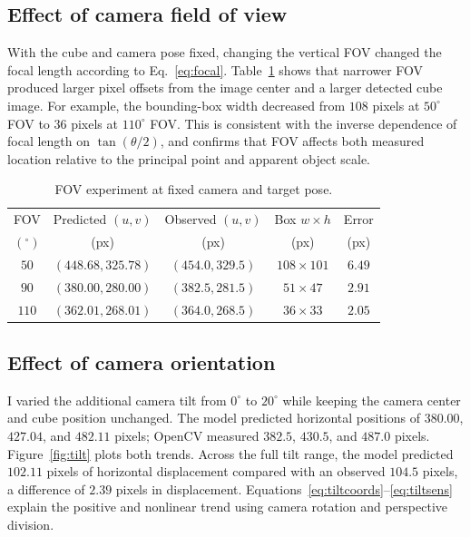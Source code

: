 \documentclass[11pt,letterpaper]{article}
\begin{document}
\subsection{Effect of camera field of view}
With the cube and camera pose fixed, changing the vertical FOV changed the focal length according to Eq.~\eqref{eq:focal}. Table~\ref{tab:fov} shows that narrower FOV produced larger pixel offsets from the image center and a larger detected cube image. For example, the bounding-box width decreased from $108$ pixels at $50^\circ$ FOV to $36$ pixels at $110^\circ$ FOV. This is consistent with the inverse dependence of focal length on $\tan(\theta/2)$, and confirms that FOV affects both measured location relative to the principal point and apparent object scale.

\begin{table}[htbp]
\centering\small
\caption{FOV experiment at fixed camera and target pose.}\label{tab:fov}
\begin{tabular}{@{}ccccc@{}}\toprule
FOV & Predicted $(u,v)$ & Observed $(u,v)$ & Box $w\times h$ & Error\\
$(^\circ)$ & (px) & (px) & (px) & (px)\\\midrule
$50$ & $(448.68,325.78)$ & $(454.0,329.5)$ & $108\times101$ & $6.49$\\
$90$ & $(380.00,280.00)$ & $(382.5,281.5)$ & $51\times47$ & $2.91$\\
$110$ & $(362.01,268.01)$ & $(364.0,268.5)$ & $36\times33$ & $2.05$\\\bottomrule
\end{tabular}
\end{table}

\subsection{Effect of camera orientation}
I varied the additional camera tilt from $0^\circ$ to $20^\circ$ while keeping the camera center and cube position unchanged. The model predicted horizontal positions of $380.00$, $427.04$, and $482.11$ pixels; OpenCV measured $382.5$, $430.5$, and $487.0$ pixels. Figure~\ref{fig:tilt} plots both trends. Across the full tilt range, the model predicted $102.11$ pixels of horizontal displacement compared with an observed $104.5$ pixels, a difference of $2.39$ pixels in displacement. Equations~\eqref{eq:tiltcoords}--\eqref{eq:tiltsens} explain the positive and nonlinear trend using camera rotation and perspective division.
\end{document}
